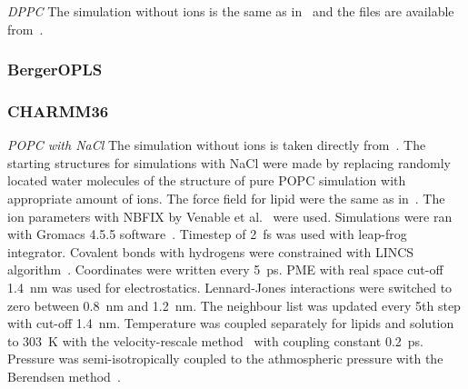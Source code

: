 \documentclass[pre,aps,floatfix,authordate1-4,twocolumn]{revtex4-1}
\begin{document}
{\it DPPC} The simulation without ions is the same as in~\cite{botan15} and the files are available from~\cite{bergerDPPCfiles}.

\subsubsection{BergerOPLS}

\subsubsection{CHARMM36}
{\it POPC with NaCl}
The simulation without ions is taken directly from~\cite{botan15,charmm36filesSHORT}. 
The starting structures for simulations with NaCl were made by replacing randomly located 
water molecules of the structure of pure POPC simulation with appropriate amount of ions.
The force field for lipid were the same as in~\cite{botan15,charmm36filesSHORT}.
The ion parameters with NBFIX by Venable et al.~\cite{venable13} were used.
Simulations were ran with Gromacs 4.5.5 software~\cite{pronk13}.
Timestep of 2~fs was used with leap-frog integrator. Covalent bonds with hydrogens were constrained with LINCS algorithm~\cite{hess97,hess07}. 
Coordinates were written every 5~ps. PME with real space cut-off 1.4~nm was used 
for electrostatics. Lennard-Jones interactions were switched to zero between 0.8~nm and 1.2~nm.
The neighbour list was updated every 5th step with cut-off 1.4~nm. Temperature was coupled separately
for lipids and solution to 303~K with the velocity-rescale method~\cite{bussi07} with coupling constant 0.2~ps.
Pressure was semi-isotropically coupled to the athmospheric pressure with the Berendsen method~\cite{berendsen84}.
\end{document}
